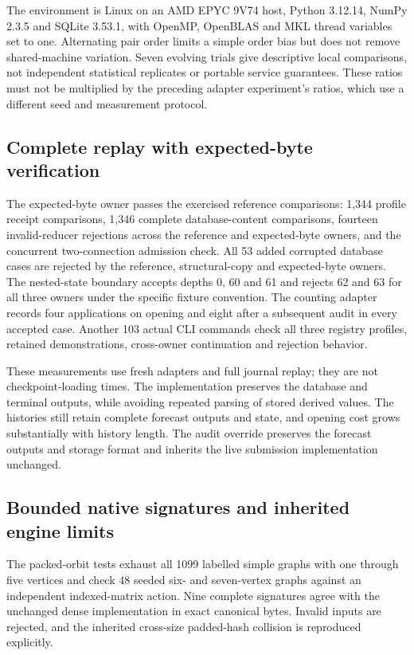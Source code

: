 \documentclass[11pt,a4paper]{article}
\theoremstyle{definition}\newtheorem{definition}[theorem]{Definition}
\begin{document}
The environment is Linux on an AMD EPYC 9V74 host, Python 3.12.14, NumPy 2.3.5 and SQLite 3.53.1, with OpenMP, OpenBLAS and MKL thread variables set to one. Alternating pair order limits a simple order bias but does not remove shared-machine variation. Seven evolving trials give descriptive local comparisons, not independent statistical replicates or portable service guarantees. These ratios must not be multiplied by the preceding adapter experiment's ratios, which use a different seed and measurement protocol.

\subsection{Complete replay with expected-byte verification}\label{sec:replayresults}
The expected-byte owner passes the exercised reference comparisons: 1,344 profile receipt comparisons, 1,346 complete database-content comparisons, fourteen invalid-reducer rejections across the reference and expected-byte owners, and the concurrent two-connection admission check. All 53 added corrupted database cases are rejected by the reference, structural-copy and expected-byte owners. The nested-state boundary accepts depths 0, 60 and 61 and rejects 62 and 63 for all three owners under the specific fixture convention. The counting adapter records four applications on opening and eight after a subsequent audit in every accepted case. Another 103 actual CLI commands check all three registry profiles, retained demonstrations, cross-owner continuation and rejection behavior.



These measurements use fresh adapters and full journal replay; they are not checkpoint-loading times. The implementation preserves the database and terminal outputs, while avoiding repeated parsing of stored derived values. The histories still retain complete forecast outputs and state, and opening cost grows substantially with history length. The audit override preserves the forecast outputs and storage format and inherits the live submission implementation unchanged.

\subsection{Bounded native signatures and inherited engine limits}\label{sec:nativepseresults}
The packed-orbit tests exhaust all 1099 labelled simple graphs with one through five vertices and check 48 seeded six- and seven-vertex graphs against an independent indexed-matrix action. Nine complete signatures agree with the unchanged dense implementation in exact canonical bytes. Invalid inputs are rejected, and the inherited cross-size padded-hash collision is reproduced explicitly.
\end{document}
